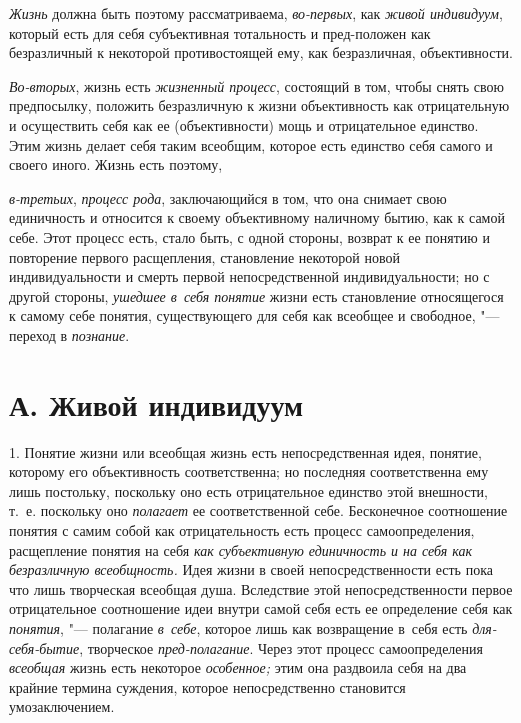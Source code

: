 {\em Жизнь} должна быть поэтому рассматриваема, {\em во-первых}, как {\em живой
индивидуум}, который есть для себя субъективная тотальность и пред-положен как
безразличный к некоторой противостоящей ему, как безразличная, объективности.

{\em Во-вторых}, жизнь есть {\em жизненный процесс}, состоящий в том, чтобы
снять свою предпосылку, положить безразличную к жизни объективность как
отрицательную и осуществить себя как ее (объективности) мощь и отрицательное
единство. Этим жизнь делает себя таким всеобщим, которое есть единство себя
самого и своего иного. Жизнь есть поэтому,

{\em в-третьих}, {\em процесс рода}, заключающийся в том, что она снимает свою
единичность и относится к своему объективному наличному бытию, как к самой
себе. Этот процесс есть, стало быть, с одной стороны, возврат к ее понятию и
повторение первого расщепления, становление некоторой новой индивидуальности и
смерть первой непосредственной индивидуальности; но с другой стороны,
{\em ушедшее в~себя понятие} жизни есть становление относящегося к самому себе
понятия, существующего для себя как всеобщее и свободное, "--- переход
в {\em познание}.

\section[А. Живой индивидуум]{А. Живой индивидуум}
1. Понятие жизни или всеобщая жизнь есть непосредственная
идея, понятие, которому его объективность соответственна; но последняя
соответственна ему лишь постольку, поскольку оно есть отрицательное
единство этой внешности, т.~е. поскольку оно
{\em полагает} ее
соответственной себе. Бесконечное соотношение понятия с самим собой как
отрицательность есть процесс самоопределения, расщепление понятия на себя
{\em как субъективную единичность и на
себя как безразличную всеобщность.} Идея жизни в своей
непосредственности есть пока что лишь творческая всеобщая душа. Вследствие
этой непосредственности первое отрицательное соотношение идеи внутри самой
себя есть ее определение себя как {\em понятия}, "--- полагание
{\em в~себе}, которое лишь как возвращение в~себя есть {\em для-себя-бытие},
творческое {\em пред-полагание}. Через этот процесс самоопределения
{\em всеобщая} жизнь есть некоторое {\em особенное;}
этим она раздвоила себя на два крайние термина суждения,
которое непосредственно становится умозаключением.

